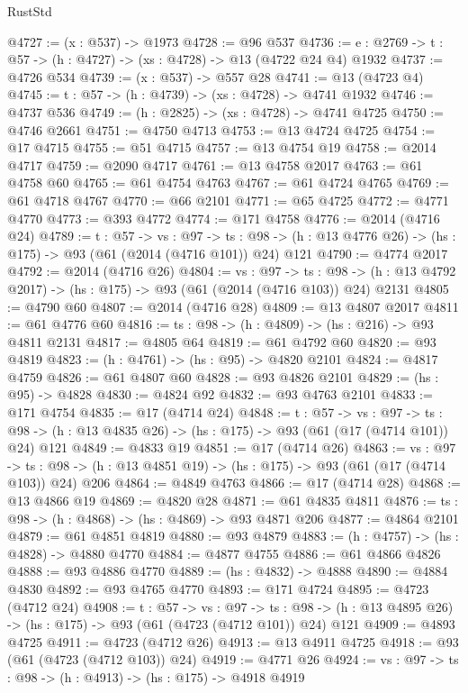 \begin{lexlean}{RustStd}
\begin{coremodule}
@4727 := (x : @537) -> @1973
@4728 := @96 @537
@4736 := {e : @2769} -> {t : @57} -> (h : @4727) -> (xs : @4728) -> @13 (@4722 @24 @4) @1932
@4737 := @4726 @534
@4739 := (x : @537) -> @557 @28
@4741 := @13 (@4723 @4)
@4745 := {t : @57} -> (h : @4739) -> (xs : @4728) -> @4741 @1932
@4746 := @4737 @536
@4749 := (h : @2825) -> (xs : @4728) -> @4741 @4725
@4750 := @4746 @2661
@4751 := @4750 @4713
@4753 := @13 @4724 @4725
@4754 := @17 @4715
@4755 := @51 @4715
@4757 := @13 @4754 @19
@4758 := @2014 @4717
@4759 := @2090 @4717
@4761 := @13 @4758 @2017
@4763 := @61 @4758 @60
@4765 := @61 @4754 @4763
@4767 := @61 @4724 @4765
@4769 := @61 @4718 @4767
@4770 := @66 @2101
@4771 := @65 @4725
@4772 := @4771 @4770
@4773 := @393 @4772
@4774 := @171 @4758
@4776 := @2014 (@4716 @24)
@4789 := {t : @57} ->
  {vs : @97} ->
  {ts : @98} -> (h : @13 @4776 @26) -> (hs : @175) -> @93 (@61 (@2014 (@4716 @101)) @24) @121
@4790 := @4774 @2017
@4792 := @2014 (@4716 @26)
@4804 := {vs : @97} ->
  {ts : @98} -> (h : @13 @4792 @2017) -> (hs : @175) -> @93 (@61 (@2014 (@4716 @103)) @24) @2131
@4805 := @4790 @60
@4807 := @2014 (@4716 @28)
@4809 := @13 @4807 @2017
@4811 := @61 @4776 @60
@4816 := {ts : @98} -> (h : @4809) -> (hs : @216) -> @93 @4811 @2131
@4817 := @4805 @64
@4819 := @61 @4792 @60
@4820 := @93 @4819
@4823 := (h : @4761) -> (hs : @95) -> @4820 @2101
@4824 := @4817 @4759
@4826 := @61 @4807 @60
@4828 := @93 @4826 @2101
@4829 := (hs : @95) -> @4828
@4830 := @4824 @92
@4832 := @93 @4763 @2101
@4833 := @171 @4754
@4835 := @17 (@4714 @24)
@4848 := {t : @57} ->
  {vs : @97} ->
  {ts : @98} -> (h : @13 @4835 @26) -> (hs : @175) -> @93 (@61 (@17 (@4714 @101)) @24) @121
@4849 := @4833 @19
@4851 := @17 (@4714 @26)
@4863 := {vs : @97} ->
  {ts : @98} -> (h : @13 @4851 @19) -> (hs : @175) -> @93 (@61 (@17 (@4714 @103)) @24) @206
@4864 := @4849 @4763
@4866 := @17 (@4714 @28)
@4868 := @13 @4866 @19
@4869 := @4820 @28
@4871 := @61 @4835 @4811
@4876 := {ts : @98} -> (h : @4868) -> (hs : @4869) -> @93 @4871 @206
@4877 := @4864 @2101
@4879 := @61 @4851 @4819
@4880 := @93 @4879
@4883 := (h : @4757) -> (hs : @4828) -> @4880 @4770
@4884 := @4877 @4755
@4886 := @61 @4866 @4826
@4888 := @93 @4886 @4770
@4889 := (hs : @4832) -> @4888
@4890 := @4884 @4830
@4892 := @93 @4765 @4770
@4893 := @171 @4724
@4895 := @4723 (@4712 @24)
@4908 := {t : @57} ->
  {vs : @97} ->
  {ts : @98} -> (h : @13 @4895 @26) -> (hs : @175) -> @93 (@61 (@4723 (@4712 @101)) @24) @121
@4909 := @4893 @4725
@4911 := @4723 (@4712 @26)
@4913 := @13 @4911 @4725
@4918 := @93 (@61 (@4723 (@4712 @103)) @24)
@4919 := @4771 @26
@4924 := {vs : @97} -> {ts : @98} -> (h : @4913) -> (hs : @175) -> @4918 @4919

\end{coremodule}
\end{lexlean}
